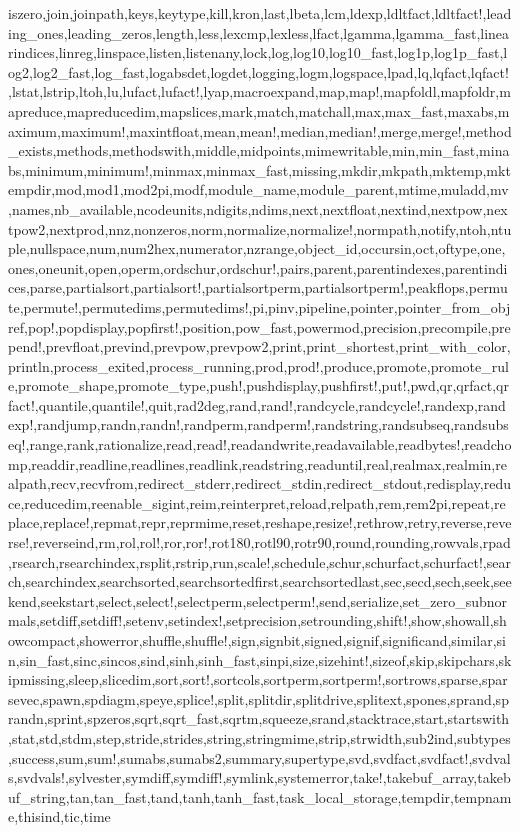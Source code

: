 {iszero,join,joinpath,keys,keytype,kill,kron,last,lbeta,lcm,ldexp,ldltfact,ldltfact!,leading_ones,leading_zeros,length,less,lexcmp,lexless,lfact,lgamma,lgamma_fast,linearindices,linreg,linspace,listen,listenany,lock,log,log10,log10_fast,log1p,log1p_fast,log2,log2_fast,log_fast,logabsdet,logdet,logging,logm,logspace,lpad,lq,lqfact,lqfact!,lstat,lstrip,ltoh,lu,lufact,lufact!,lyap,macroexpand,map,map!,mapfoldl,mapfoldr,mapreduce,mapreducedim,mapslices,mark,match,matchall,max,max_fast,maxabs,maximum,maximum!,maxintfloat,mean,mean!,median,median!,merge,merge!,method_exists,methods,methodswith,middle,midpoints,mimewritable,min,min_fast,minabs,minimum,minimum!,minmax,minmax_fast,missing,mkdir,mkpath,mktemp,mktempdir,mod,mod1,mod2pi,modf,module_name,module_parent,mtime,muladd,mv,names,nb_available,ncodeunits,ndigits,ndims,next,nextfloat,nextind,nextpow,nextpow2,nextprod,nnz,nonzeros,norm,normalize,normalize!,normpath,notify,ntoh,ntuple,nullspace,num,num2hex,numerator,nzrange,object_id,occursin,oct,oftype,one,ones,oneunit,open,operm,ordschur,ordschur!,pairs,parent,parentindexes,parentindices,parse,partialsort,partialsort!,partialsortperm,partialsortperm!,peakflops,permute,permute!,permutedims,permutedims!,pi,pinv,pipeline,pointer,pointer_from_objref,pop!,popdisplay,popfirst!,position,pow_fast,powermod,precision,precompile,prepend!,prevfloat,prevind,prevpow,prevpow2,print,print_shortest,print_with_color,println,process_exited,process_running,prod,prod!,produce,promote,promote_rule,promote_shape,promote_type,push!,pushdisplay,pushfirst!,put!,pwd,qr,qrfact,qrfact!,quantile,quantile!,quit,rad2deg,rand,rand!,randcycle,randcycle!,randexp,randexp!,randjump,randn,randn!,randperm,randperm!,randstring,randsubseq,randsubseq!,range,rank,rationalize,read,read!,readandwrite,readavailable,readbytes!,readchomp,readdir,readline,readlines,readlink,readstring,readuntil,real,realmax,realmin,realpath,recv,recvfrom,redirect_stderr,redirect_stdin,redirect_stdout,redisplay,reduce,reducedim,reenable_sigint,reim,reinterpret,reload,relpath,rem,rem2pi,repeat,replace,replace!,repmat,repr,reprmime,reset,reshape,resize!,rethrow,retry,reverse,reverse!,reverseind,rm,rol,rol!,ror,ror!,rot180,rotl90,rotr90,round,rounding,rowvals,rpad,rsearch,rsearchindex,rsplit,rstrip,run,scale!,schedule,schur,schurfact,schurfact!,search,searchindex,searchsorted,searchsortedfirst,searchsortedlast,sec,secd,sech,seek,seekend,seekstart,select,select!,selectperm,selectperm!,send,serialize,set_zero_subnormals,setdiff,setdiff!,setenv,setindex!,setprecision,setrounding,shift!,show,showall,showcompact,showerror,shuffle,shuffle!,sign,signbit,signed,signif,significand,similar,sin,sin_fast,sinc,sincos,sind,sinh,sinh_fast,sinpi,size,sizehint!,sizeof,skip,skipchars,skipmissing,sleep,slicedim,sort,sort!,sortcols,sortperm,sortperm!,sortrows,sparse,sparsevec,spawn,spdiagm,speye,splice!,split,splitdir,splitdrive,splitext,spones,sprand,sprandn,sprint,spzeros,sqrt,sqrt_fast,sqrtm,squeeze,srand,stacktrace,start,startswith,stat,std,stdm,step,stride,strides,string,stringmime,strip,strwidth,sub2ind,subtypes,success,sum,sum!,sumabs,sumabs2,summary,supertype,svd,svdfact,svdfact!,svdvals,svdvals!,sylvester,symdiff,symdiff!,symlink,systemerror,take!,takebuf_array,takebuf_string,tan,tan_fast,tand,tanh,tanh_fast,task_local_storage,tempdir,tempname,thisind,tic,time}
